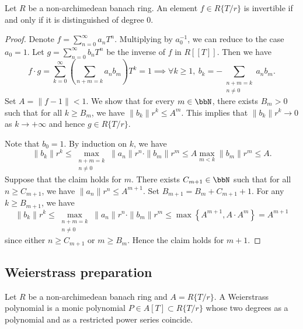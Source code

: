     \begin{proposition}\label{prop:restricted_power_series_invertible_iff_the_constant_item_is_invertible_and_controls_others}
        Let \(R\) be a non-archimedean banach ring.
        An element \(f \in R\{T/r\}\) is invertible if and only if it is distinguished of degree \(0\).
    \end{proposition}
    \begin{proof}
        Denote \(f = \sum_{n=0}^{\infty} a_n T^n\).
        Multiplying by \(a_0^{-1}\), we can reduce to the case \(a_0 = 1\).
        Let \(g = \sum_{n=0}^{\infty} b_n T^n\) be the inverse of \(f\) in \(R[[T]]\).
        Then we have
        \[ f \cdot g = \sum_{k=0}^{\infty} \left( \sum_{n + m = k} a_n b_m \right) T^k = 1 \implies \forall k \geq 1,\ b_k = - \sum_{\substack{n + m = k \\ n \neq 0}} a_n b_m. \]
        Set \(A = \|f-1\| < 1\).
        We show that for every \(m \in \bbN\), there exists \(B_m > 0\) such that for all \(k \geq B_m\), we have \(\|b_k\| r^k \leq A^m\).
        This implies that \(\|b_k\| r^k \to 0\) as \(k \to +\infty\) and hence \(g \in R\{T/r\}\).

        Note that \(b_0 = 1\).
        By induction on \(k\), we have
        \[ \|b_k\| r^k \leq \max_{\substack{n + m = k \\ n \neq 0}} \|a_n\| r^n \cdot \|b_m\| r^m \leq A \max_{m < k} \|b_m\| r^m \leq A. \]
        Suppose that the claim holds for \(m\).
        There exists \(C_{m+1} \in \bbN\) such that for all \(n \geq C_{m+1}\), we have \(\|a_n\| r^n \leq A^{m+1}\).
        Set \(B_{m+1} = B_m + C_{m+1} + 1\).
        For any \(k \geq B_{m+1}\), we have
        \[ \|b_k\| r^k \leq \max_{\substack{n + m = k \\ n \neq 0}} \|a_n\| r^n \cdot \|b_m\| r^m \leq \max \left\{ A^{m+1}, A \cdot A^m \right\} = A^{m+1} \]
        since either \(n \geq C_{m+1}\) or \(m \geq B_m\).
        Hence the claim holds for \(m+1\).
    \end{proof}


\subsection{Weierstrass preparation}

    \begin{definition}\label{def:Weierstrass_polynomial}
        Let \(R\) be a non-archimedean banach ring and \(A = R\{ T/r \} \).
        A Weierstrass polynomial is a monic polynomial \(P \in A[T] \subset R\{T/r\}\) whose two degrees as a polynomial and as a restricted power series coincide.
    \end{definition}

